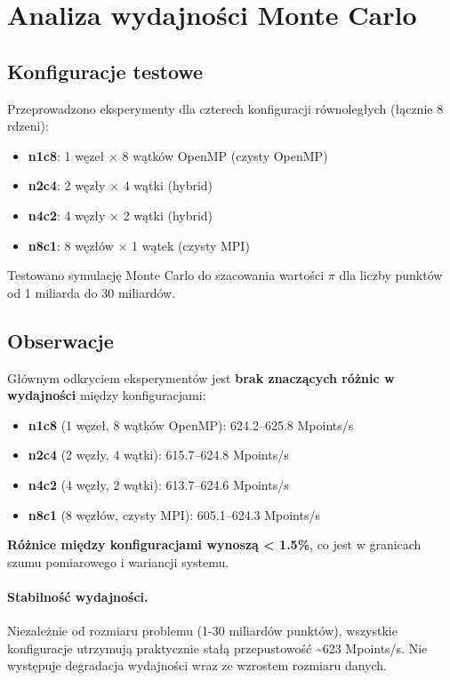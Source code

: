 \section{Analiza wydajności Monte Carlo}

\subsection{Konfiguracje testowe}

Przeprowadzono eksperymenty dla czterech konfiguracji równoległych (łącznie 8 rdzeni):
\begin{itemize}
    \item \textbf{n1c8}: 1 węzeł × 8 wątków OpenMP (czysty OpenMP)
    \item \textbf{n2c4}: 2 węzły × 4 wątki (hybrid)
    \item \textbf{n4c2}: 4 węzły × 2 wątki (hybrid)
    \item \textbf{n8c1}: 8 węzłów × 1 wątek (czysty MPI)
\end{itemize}

Testowano symulację Monte Carlo do szacowania wartości $\pi$ dla liczby punktów od 1 miliarda do 30 miliardów.

\subsection{Obserwacje}

Głównym odkryciem eksperymentów jest \textbf{brak znaczących różnic w wydajności} między konfiguracjami:

\begin{itemize}
    \item \textbf{n1c8} (1 węzeł, 8 wątków OpenMP): 624.2--625.8 Mpoints/s
    \item \textbf{n2c4} (2 węzły, 4 wątki): 615.7--624.8 Mpoints/s
    \item \textbf{n4c2} (4 węzły, 2 wątki): 613.7--624.6 Mpoints/s
    \item \textbf{n8c1} (8 węzłów, czysty MPI): 605.1--624.3 Mpoints/s
\end{itemize}

\textbf{Różnice między konfiguracjami wynoszą < 1.5\%}, co jest w granicach szumu pomiarowego i wariancji systemu.

\paragraph{Stabilność wydajności.} Niezależnie od rozmiaru problemu (1-30 miliardów punktów), wszystkie konfiguracje utrzymują praktycznie stałą przepustowość \textasciitilde{}623 Mpoints/s. Nie występuje degradacja wydajności wraz ze wzrostem rozmiaru danych.

